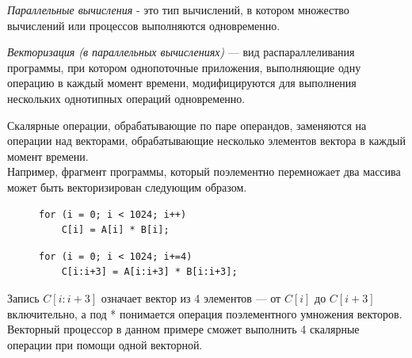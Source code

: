 \documentclass[a4paper, 12pt]{article}
\begin{document}
\textit{Параллельные вычисления} - это тип вычислений, в котором множество вычислений или процессов выполняются одновременно. 

\textit{Векторизация (в параллельных вычислениях)} — вид распараллеливания программы, при котором однопоточные приложения, выполняющие одну операцию в каждый момент времени, модифицируются для выполнения нескольких однотипных операций одновременно.

Скалярные операции, обрабатывающие по паре операндов, заменяются на операции над векторами, обрабатывающие несколько элементов вектора в каждый момент времени.\\

Например,  фрагмент программы, который поэлементно перемножает два массива может быть векторизирован следующим образом.

\begin{figure}[!htb]
   \begin{minipage}{0.48\textwidth}
    \begin{lstlisting}
for (i = 0; i < 1024; i++)
    C[i] = A[i] * B[i];
    \end{lstlisting}
   \end{minipage}\hfill
   \begin{minipage}{0.48\textwidth}
    \begin{lstlisting}
for (i = 0; i < 1024; i+=4)
    C[i:i+3] = A[i:i+3] * B[i:i+3];
    \end{lstlisting}
   \end{minipage}
\end{figure}

Запись $C[i:i+3]$ означает вектор из 4 элементов — от $C[i]$ до $C[i+3]$ включительно, а под * понимается операция поэлементного умножения векторов. Векторный процессор в данном примере сможет выполнить 4 скалярные операции при помощи одной векторной.\\
\end{document}
